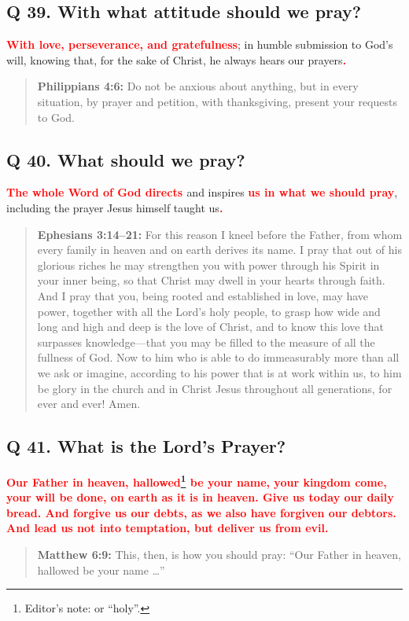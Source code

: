 \documentclass[titlepage]{memoir}
\newcommand\Children[1]{\textbf{\textcolor{red}{#1}}}
\newcommand\Quote[2]{\begin{quote}{\small\textbf{#1:}{ #2}}\end{quote}}
\begin{document}
\subsection{Q 39. With what attitude should we pray?}
\Children{With love, perseverance, and gratefulness}; in humble submission to God's will, knowing that, for the sake of Christ, he always hears our prayers\Children{.}

\Quote{Philippians 4:6}{Do not be anxious about anything, but in every situation, by prayer and petition, with thanksgiving, present your requests to God.}

\subsection{Q 40. What should we pray?}
\Children{The whole Word of God directs }and inspires \Children{us in what we should pray}, including the prayer Jesus himself taught us\Children{.}

\Quote{Ephesians 3:14--21}{For this reason I kneel before the Father, from whom every family in heaven and on earth derives its name. I pray that out of his glorious riches he may strengthen you with power through his Spirit in your inner being, so that Christ may dwell in your hearts through faith. And I pray that you, being rooted and established in love, may have power, together with all the Lord's holy people, to grasp how wide and long and high and deep is the love of Christ, and to know this love that surpasses knowledge\thinspace{}---\thinspace{}that you may be filled to the measure of all the fullness of God. Now to him who is able to do immeasurably more than all we ask or imagine, according to his power that is at work within us, to him be glory in the church and in Christ Jesus throughout all generations, for ever and ever! Amen.}

\subsection{Q 41. What is the Lord's Prayer?}
\Children{Our Father in heaven, hallowed\footnote{Editor's note: or ``holy''.} be your name, your kingdom come, your will be done, on earth as it is in heaven. Give us today our daily bread. And forgive us our debts, as we also have forgiven our debtors. And lead us not into temptation, but deliver us from evil.}

\Quote{Matthew 6:9}{This, then, is how you should pray: ``Our Father in heaven, hallowed be your name {\dots}''}
\end{document}
